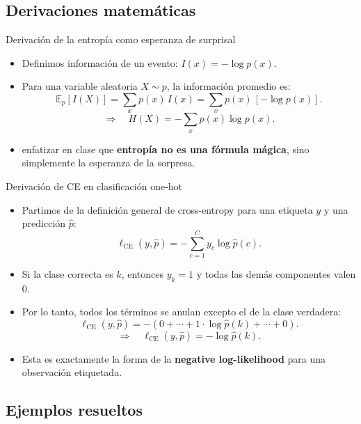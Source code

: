 \subsection[Derivaciones]{Derivaciones matemáticas}

\begin{frame}{Derivación de la entropía como esperanza de surprisal}
\begin{itemize}
  \item Definimos información de un evento: \(I(x)=-\log p(x)\).
  \item Para una variable aleatoria \(X\sim p\), la información promedio es:
  \[
    \mathbb{E}_p[I(X)]
    = \sum_x p(x)\,I(x)
    = \sum_x p(x)\,[-\log p(x)].
  \]
  \[
    \Rightarrow\quad H(X) = -\sum_x p(x)\log p(x).
  \]
  \item {} enfatizar en clase que \textbf{entropía no es una fórmula mágica}, sino simplemente la esperanza de la sorpresa.
\end{itemize}
\end{frame}

\begin{frame}{Derivación de CE en clasificación one-hot}
\begin{itemize}
  \item Partimos de la definición general de cross-entropy para una etiqueta \(y\) y una predicción \(\hat p\):
  \[
    \ell_{\mathrm{CE}}(y,\hat p) = -\sum_{c=1}^C y_c \log \hat p(c).
  \]
  \item Si la clase correcta es \(k\), entonces \(y_k=1\) y todas las demás componentes valen 0.
  \item Por lo tanto, todos los términos se anulan excepto el de la clase verdadera:
  \[
    \ell_{\mathrm{CE}}(y,\hat p)
    = -(0 + \cdots + 1\cdot \log \hat p(k) + \cdots + 0).
  \]
  \[
    \Rightarrow\quad \ell_{\mathrm{CE}}(y,\hat p) = -\log \hat p(k).
  \]
  \item Esta es exactamente la forma de la \textbf{negative log-likelihood} para una observación etiquetada.
\end{itemize}
\end{frame}

\subsection[Ejemplos]{Ejemplos resueltos}

